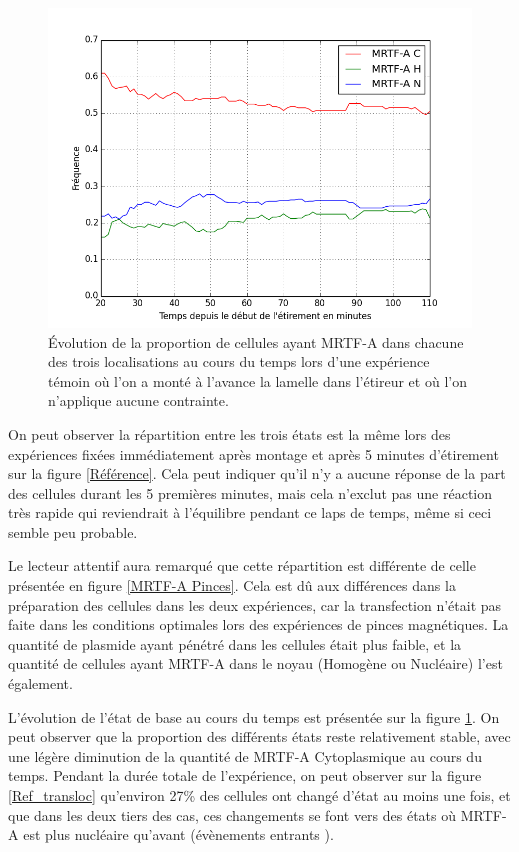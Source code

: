 \begin{figure}
\includegraphics[scale=0.4]{Figures/CHN_vs_Temps_reference.png} 
\caption{\label{Reference_dynamique} \'E{}volution de la proportion de cellules ayant MRTF-A dans chacune des trois localisations au cours du temps lors d'une expérience témoin où l'on a monté à l'avance la lamelle dans l'étireur et où l'on n'applique aucune contrainte.}
\end{figure}

On peut observer la répartition entre les trois états est la même lors des expériences fixées immédiatement après montage et après 5 minutes d'étirement sur la figure \ref{Référence}.
Cela peut indiquer qu'il n'y a aucune réponse de la part des cellules durant les 5 premières minutes, mais cela n'exclut pas une réaction très rapide qui reviendrait à l'équilibre pendant ce laps de temps, même si ceci semble peu probable. 

Le lecteur attentif aura remarqué que cette répartition est différente de celle présentée en figure \ref{MRTF-A Pinces}. 
Cela est dû aux différences dans la préparation des cellules dans les deux expériences, car la transfection n'était pas faite dans les conditions optimales lors des expériences de pinces magnétiques. 
La quantité de plasmide ayant pénétré dans les cellules était plus faible, et la quantité de cellules ayant MRTF-A dans le noyau (Homogène ou Nucléaire) l'est également. 


L'évolution de l'état de base au cours du temps est présentée sur la figure \ref{Reference_dynamique}. On peut observer que la proportion des différents états reste relativement stable, avec une légère diminution de la quantité de MRTF-A Cytoplasmique au cours du temps. 
Pendant la durée totale de l'expérience, on peut observer sur la figure \ref{Ref_transloc} qu'environ 27\% des cellules ont changé d'état au moins une fois, et que dans les deux tiers des cas, ces changements se font vers des états où MRTF-A est plus nucléaire qu'avant (évènements \og entrants \fg). 

